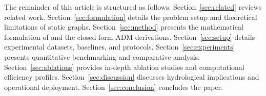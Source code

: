 The remainder of this article is structured as follows. Section~\ref{sec:related} reviews related work. Section~\ref{sec:formulation} details the problem setup and theoretical limitations of static graphs. Section~\ref{sec:method} presents the mathematical formulation of \rllctim{} and the closed-form ADM derivations. Section~\ref{sec:setup} details experimental datasets, baselines, and protocols. Section~\ref{sec:experiments} presents quantitative benchmarking and comparative analysis. Section~\ref{sec:ablations} provides in-depth ablation studies and computational efficiency profiles. Section~\ref{sec:discussion} discusses hydrological implications and operational deployment. Section~\ref{sec:conclusion} concludes the paper.
